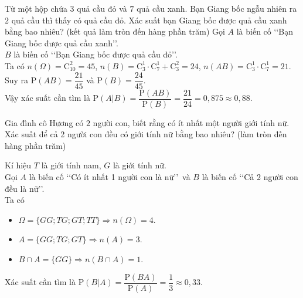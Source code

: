 \begin{ex}%
	Từ một hộp chứa $3$ quả cầu đỏ và $7$ quả cầu xanh. Bạn Giang bốc ngẫu nhiên ra $2$ quả cầu thì thấy có quả cầu đỏ. Xác suất bạn Giang bốc được quả cầu xanh bằng bao nhiêu? (kết quả làm tròn đến hàng phần trăm)
	\loigiai
	{
		Gọi $A$ là biến cố \lq\lq Bạn Giang bốc được quả cầu xanh\rq\rq.\\
		$B$ là biến cố \lq\lq Bạn Giang bốc được quả cầu đỏ\rq\rq.\\
		Ta có $n(\Omega)= \mathrm{C}_{10}^2=45$, $n(B)= \mathrm{C}_3^1 \cdot \mathrm{C}_7^1 + \mathrm{C}_3^2= 24$, $n(AB)= \mathrm{C}_3^1\cdot \mathrm{C}_7^1=21$.\\
		Suy ra $\mathrm{P}(AB)= \dfrac{21}{45}$ và $\mathrm{P}(B)= \dfrac{24}{45}$.\\
		Vậy xác suất cần tìm là $\mathrm{P}(A|B)= \dfrac{\mathrm{P}(AB)}{\mathrm{P}(B)}= \dfrac{21}{24}= 0{,}875 \approx 0{,}88$.
	}
\end{ex}

\begin{ex}%
	Gia đình cô Hương có $2$ người con, biết rằng có ít nhất một người giới tính nữ. Xác suất để cả 2 người con đều có giới tính nữ bằng bao nhiêu? (làm tròn đến hàng phần trăm)
	\loigiai
	{
		Kí hiệu $T$ là giới tính nam, $G$ là giới tính nữ.\\
		Gọi $A$ là biến cố \lq\lq Có ít nhất 1 người con là nữ\rq\rq\ và $B$ là biến cố \lq\lq Cả 2 người con đều là nữ\rq\rq.\\ Ta có
		\begin{itemize}
			\item $\Omega= \{GG; TG; GT; TT\} \Rightarrow n(\Omega)= 4$.
			\item $A= \{GG; TG; GT\} \Rightarrow n(A)=3$.
			\item $B\cap A=\{GG\} \Rightarrow n(B \cap A)=1$.
		\end{itemize}		
		Xác suất cần tìm là $\mathrm{P}(B|A)= \dfrac{\mathrm{P}(BA)}{\mathrm{P}(A)}= \dfrac{1}{3}\approx 0{,}33$.
	}
\end{ex}

